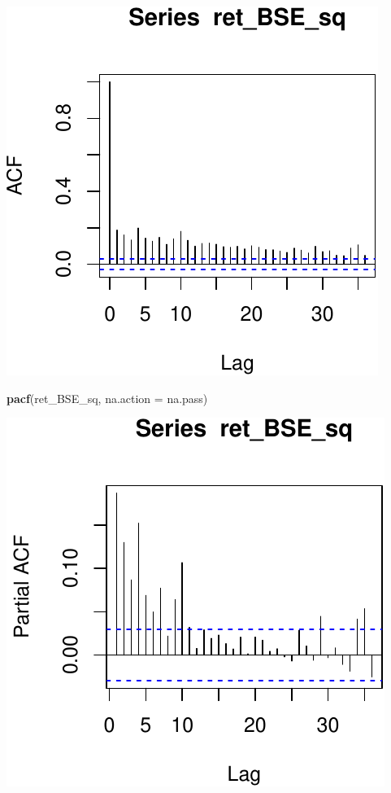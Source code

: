 \documentclass[11pt,]{article}
\newenvironment{Shaded}{\begin{snugshade}}{\end{snugshade}}
\newcommand{\KeywordTok}[1]{\textcolor[rgb]{0.13,0.29,0.53}{\textbf{#1}}}
\newcommand{\DataTypeTok}[1]{\textcolor[rgb]{0.13,0.29,0.53}{#1}}
\newcommand{\NormalTok}[1]{#1}
\begin{document}
\begin{center}\includegraphics{FMC_T4_PhD_ARMA_GARCH_files/figure-latex/BSE_ret_ACF_sq-1} \end{center}

\begin{Shaded}
\begin{Highlighting}[]
\KeywordTok{pacf}\NormalTok{(ret_BSE_sq, }\DataTypeTok{na.action =}\NormalTok{ na.pass)}
\end{Highlighting}
\end{Shaded}

\begin{center}\includegraphics{FMC_T4_PhD_ARMA_GARCH_files/figure-latex/BSE_ret_ACF_sq-2} \end{center}
\end{document}
